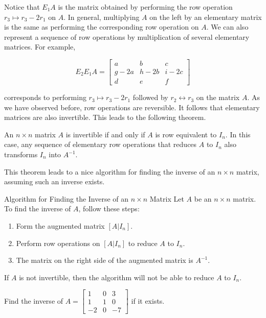 Notice that $E_1 A$ is the matrix obtained by performing the row operation $r_3 \mapsto r_3-2 r_1$ on $A$. In general, multiplying $A$ on the left by an elementary matrix is the same as performing the corresponding row operation on $A$. We can also represent a sequence of row operations by multiplication of several elementary matrices. For example,

\[
E_2 E_1 A=\left[\begin{array}{ccc}
a & b & c \\
g-2 a & h-2 b & i-2 c \\
d & e & f
\end{array}\right]
\]

corresponds to performing $r_3 \mapsto r_3-2 r_1$ followed by $r_2 \longleftrightarrow r_3$ on the matrix $A$.
As we have observed before, row operations are reversible. It follows that elementary matrices are also invertible. This leads to the following theorem.

\begin{theorem}
    An $n \times n$ matrix $A$ is invertible if and only if $A$ is row equivalent to $I_n$. In this case, any sequence of elementary row operations that reduces $A$ to $I_n$ also transforms $I_n$ into $A^{-1}$.
\end{theorem}

This theorem leads to a nice algorithm for finding the inverse of an $n \times n$ matrix, assuming such an inverse exists.

\begin{custombox}{Algorithm for Finding the Inverse of an $n \times n$ Matrix}
    Let $A$ be an $n \times n$ matrix. To find the inverse of $A$, follow these steps:
    \begin{enumerate}
        \item Form the augmented matrix $[A | I_n]$.
        \item Perform row operations on $[A | I_n]$ to reduce $A$ to $I_n$.
        \item The matrix on the right side of the augmented matrix is $A^{-1}$.
    \end{enumerate}

    If $A$ is not invertible, then the algorithm will not be able to reduce $A$ to $I_n$.
\end{custombox}

\begin{example} Find the inverse of $A=\left[\begin{array}{rrr}1 & 0 & 3 \\ 1 & 1 & 0 \\ -2 & 0 & -7\end{array}\right]$ if it exists.    
\end{example}


